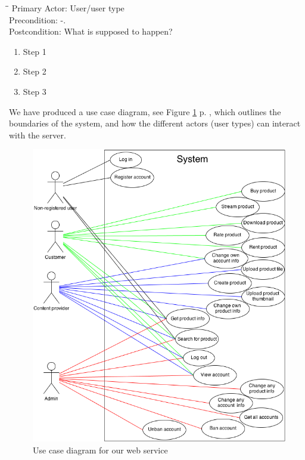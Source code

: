 \begin{tabbing}
\hspace{5mm}\=\hspace{26mm}\=\kill
\>Primary Actor:\> User/user type\\
\>Precondition:\> -.\\
\>Postcondition:\> What is supposed to happen?
\end{tabbing}
\begin{enumerate}
	\item Step 1
	\item Step 2
	\item Step 3
\end{enumerate}
\vspace{3mm}

We have produced a use case diagram, see Figure \ref{useCaseImg} p. \pageref{useCaseImg}, which outlines the boundaries of the system, and how the different actors (user types) can interact with the server. 
\begin{figure}[h]
\centering
\includegraphics[scale=0.5]{illustrations/UseCaseDiagram.png}
\caption{Use case diagram for our web service}
\label{useCaseImg}
\end{figure}